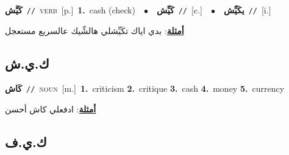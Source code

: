 \documentclass[10pt,a4paper,twoside]{article} %
\begin{document}
\begin{multicols}{2}
{\setlength\topsep{0pt}\textbf{\foreignlanguage{arabic}{كَيَّش}}\ {\color{gray}\texttt{//}\color{black}}\ \textsc{verb}\ [p.]\ \textbf{1.}~cash (check)\ \ $\bullet$\ \ \setlength\topsep{0pt}\textbf{\foreignlanguage{arabic}{كَيِّش}}\ {\color{gray}\texttt{//}\color{black}}\ [c.]\ \ $\bullet$\ \ \setlength\topsep{0pt}\textbf{\foreignlanguage{arabic}{يكَيِّش}}\ {\color{gray}\texttt{//}\color{black}}\ [i.]\  \begin{flushright}\color{gray}\foreignlanguage{arabic}{\textbf{\underline{\foreignlanguage{arabic}{أمثلة}}}: بدي اياك تكَيِّشلي هالشِّيك عالسريع مستعجل}\end{flushright}\color{black}} \vspace{2mm}

\vspace{-3mm}
\subsection*{\color{blue}\foreignlanguage{arabic}{ك.ي.ش}\color{blue}{ (ntws)}} 

{\setlength\topsep{0pt}\textbf{\foreignlanguage{arabic}{كَاش}}\ {\color{gray}\texttt{//}\color{black}}\ \textsc{noun}\ [m.]\ \textbf{1.}~criticism  \textbf{2.}~critique  \textbf{3.}~cash  \textbf{4.}~money  \textbf{5.}~currency\  \begin{flushright}\color{gray}\foreignlanguage{arabic}{\textbf{\underline{\foreignlanguage{arabic}{أمثلة}}}: ادفعلي كاش أحسن}\end{flushright}\color{black}} \vspace{2mm}

\vspace{-3mm}
\subsection*{\color{blue}\foreignlanguage{arabic}{ك.ي.ف}\color{blue}{}} 


\end{multicols}
\end{document}

